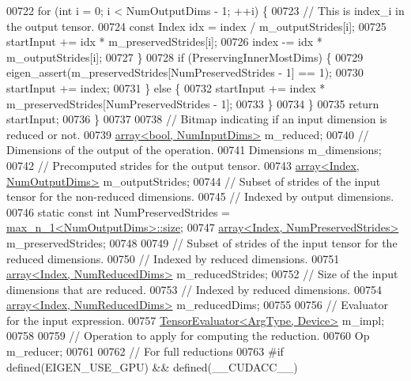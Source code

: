 \begin{DoxyCode}
00722       \textcolor{keywordflow}{for} (\textcolor{keywordtype}{int} i = 0; i < NumOutputDims - 1; ++i) \{
00723         \textcolor{comment}{// This is index\_i in the output tensor.}
00724         \textcolor{keyword}{const} Index idx = index / m\_outputStrides[i];
00725         startInput += idx * m\_preservedStrides[i];
00726         index -= idx * m\_outputStrides[i];
00727       \}
00728       \textcolor{keywordflow}{if} (PreservingInnerMostDims) \{
00729         eigen\_assert(m\_preservedStrides[NumPreservedStrides - 1] == 1);
00730         startInput += index;
00731       \} \textcolor{keywordflow}{else} \{
00732         startInput += index * m\_preservedStrides[NumPreservedStrides - 1];
00733       \}
00734     \}
00735     \textcolor{keywordflow}{return} startInput;
00736   \}
00737 
00738   \textcolor{comment}{// Bitmap indicating if an input dimension is reduced or not.}
00739   \hyperlink{class_eigen_1_1array}{array<bool, NumInputDims>} m\_reduced;
00740   \textcolor{comment}{// Dimensions of the output of the operation.}
00741   Dimensions m\_dimensions;
00742   \textcolor{comment}{// Precomputed strides for the output tensor.}
00743   \hyperlink{class_eigen_1_1array}{array<Index, NumOutputDims>} m\_outputStrides;
00744   \textcolor{comment}{// Subset of strides of the input tensor for the non-reduced dimensions.}
00745   \textcolor{comment}{// Indexed by output dimensions.}
00746   \textcolor{keyword}{static} \textcolor{keyword}{const} \textcolor{keywordtype}{int} NumPreservedStrides = \hyperlink{struct_eigen_1_1max__n__1}{max\_n\_1<NumOutputDims>::size};
00747   \hyperlink{class_eigen_1_1array}{array<Index, NumPreservedStrides>} m\_preservedStrides;
00748 
00749   \textcolor{comment}{// Subset of strides of the input tensor for the reduced dimensions.}
00750   \textcolor{comment}{// Indexed by reduced dimensions.}
00751   \hyperlink{class_eigen_1_1array}{array<Index, NumReducedDims>} m\_reducedStrides;
00752   \textcolor{comment}{// Size of the input dimensions that are reduced.}
00753   \textcolor{comment}{// Indexed by reduced dimensions.}
00754   \hyperlink{class_eigen_1_1array}{array<Index, NumReducedDims>} m\_reducedDims;
00755 
00756   \textcolor{comment}{// Evaluator for the input expression.}
00757   \hyperlink{struct_eigen_1_1_tensor_evaluator}{TensorEvaluator<ArgType, Device>} m\_impl;
00758 
00759   \textcolor{comment}{// Operation to apply for computing the reduction.}
00760   Op m\_reducer;
00761 
00762   \textcolor{comment}{// For full reductions}
00763 \textcolor{preprocessor}{#if defined(EIGEN\_USE\_GPU) && defined(\_\_CUDACC\_\_)}

\end{DoxyCode}
